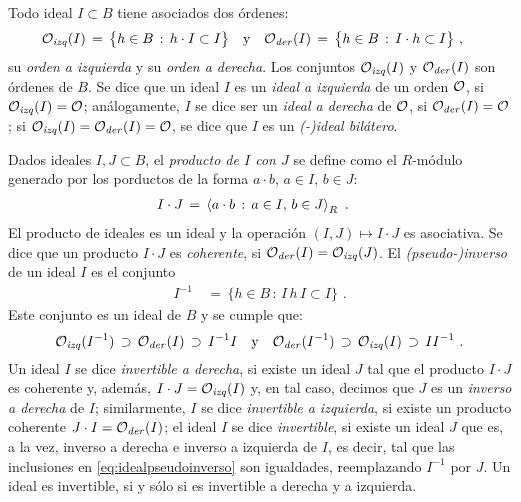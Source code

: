 Todo ideal $I\subset B$ tiene asociados dos \'{o}rdenes:
\begin{align*}
	\Oizq(I) \,=\,\big\{h\in B\,:\,h\cdot I\subset I\big\}
		&\quad\text{y}\quad
	\Oder(I) \,=\,\big\{h\in B\,:\,I\cdot h\subset I\big\}
	\text{ ,}
\end{align*}
%
su \emph{orden a izquierda} y su \emph{orden a derecha}.
Los conjuntos $\Oizq(I)$ y $\Oder(I)$ son \'{o}rdenes de $B$. Se dice que un
ideal $I$ es un \emph{ideal a izquierda} de un orden
$\cal{O}$, si $\Oizq(I)=\cal{O}$; an\'{a}logamente, $I$ se dice ser un
\emph{ideal a derecha} de $\cal{O}$, si $\Oder(I)=\cal{O}$; si
$\Oizq(I)=\Oder(I)=\cal{O}$, se dice que $I$ es un
\emph{(-)ideal bil\'{a}tero}.

Dados ideales $I,J\subset B$, el \emph{producto de $I$ con $J$} se define como
el $R$-m\'{o}dulo generado por los porductos de la forma $a\cdot b$, $a\in I$,
$b\in J$:
\begin{align*}
	I\cdot J & \,=\,\generado[R]{a\cdot b\,:\,a\in I,\,b\in J}
	\text{ .}
\end{align*}
%
El producto de ideales es un ideal
y la operaci\'{o}n $(I,J)\mapsto I\cdot J$ es asociativa. Se dice que un
producto $I\cdot J$ es \emph{coherente}, si $\Oder(I)=\Oizq(J)$.
El \emph{(pseudo-)inverso} de un ideal $I$ es el conjunto
\begin{align*}
	I^{-1} & \,=\,\big\{h\in B\,:\,I\,h\,I\subset I\big\}
	\text{ .}
\end{align*}
%
Este conjunto es un ideal de $B$
y se cumple que:
\begin{equation}
	\label{eq:idealpseudoinverso}
	\Oizq(I^{-1})\,\supset\,\Oder(I)\,\supset\,I^{-1}I
		\quad\text{y}\quad
	\Oder(I^{-1})\,\supset\,\Oizq(I)\,\supset\,II^{-1}
	\text{ .}
\end{equation}
%
Un ideal $I$ se dice \emph{invertible a derecha}, si existe un ideal $J$ tal
que el producto $I\cdot J$ es coherente y, adem\'{a}s, $I\cdot J=\Oizq(I)$ y,
en tal caso, decimos que $J$ es un \emph{inverso a derecha} de $I$;
similarmente, $I$ se dice \emph{invertible a izquierda}, si existe un producto
coherente $J\cdot I=\Oder(I)$; el ideal $I$ se dice \emph{invertible}, si
existe un ideal $J$ que es, a la vez, inverso a derecha e inverso a izquierda
de $I$, es decir, tal que las inclusiones en \eqref{eq:idealpseudoinverso} son
igualdades, reemplazando $I^{-1}$ por $J$. Un ideal es invertible, si y
s\'{o}lo si es invertible a derecha y a izquierda.

